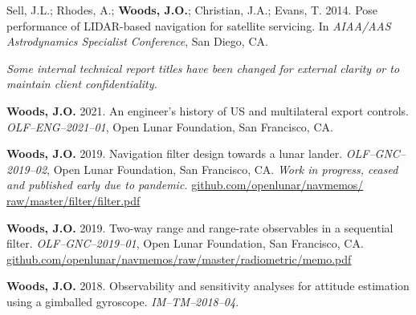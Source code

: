 \documentclass[12pt,letterpaper]{article}
\newcommand{\mhead}[1]{\leavevmode\marginpar{\sffamily\footnotesize #1}}
\begin{document}
\medskip
Sell, J.L.; Rhodes, A.; \textbf{Woods, J.O.}; Christian, J.A.; Evans, T. 2014. Pose performance of LIDAR-based navigation for satellite servicing. In \textit{AIAA/AAS Astrodynamics Specialist Conference}, San Diego, CA.

%
%
\bigskip
\mhead{Technical \newline Reports}%
\par\vspace{-\baselineskip}\textit{Some internal technical report titles have been changed for external clarity or to maintain client confidentiality.}

\medskip
\par\textbf{Woods, J.O.} 2021. An engineer's history of US and multilateral export controls. \textit{OLF--ENG--2021--01}, Open Lunar Foundation, San Francisco, CA.


\medskip
\par\textbf{Woods, J.O.} 2019. Navigation filter design towards a lunar lander. \textit{OLF--GNC--2019--02}, Open Lunar Foundation, San Francisco, CA. \textit{Work in progress, ceased and published early due to pandemic.} \href{https://github.com/openlunar/navmemos/raw/master/filter/filter.pdf}{github.com/openlunar/navmemos/ raw/master/filter/filter.pdf}

\medskip
\par\textbf{Woods, J.O.} 2019. Two-way range and range-rate observables in a sequential filter. \textit{OLF--GNC--2019--01}, Open Lunar Foundation, San Francisco, CA. \href{https://github.com/openlunar/navmemos/raw/master/radiometric/memo.pdf}{github.com/openlunar/navmemos/raw/master/radiometric/memo.pdf}

\medskip
\par\textbf{Woods, J.O.} 2018. Observability and sensitivity analyses for attitude estimation using a gimballed gyroscope. \textit{IM--TM--2018--04}.
\end{document}
